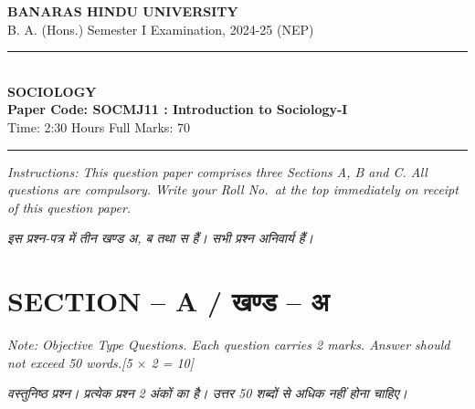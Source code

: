 \documentclass[11pt,a4paper]{article}
\newcommand{\pts}[1]{\hfill \textit{[#1]}}
\begin{document}
\begin{center}
  {\large\bfseries BANARAS HINDU UNIVERSITY}\\[2pt]
  {\normalsize B. A. (Hons.) Semester I Examination, 2024-25 (NEP)}\\[6pt]
  \rule{0.8\linewidth}{0.5pt}\\[6pt]
  {\large\bfseries SOCIOLOGY}\\[4pt]
  {\large\bfseries Paper Code: SOCMJ11 : Introduction to Sociology-I}\\[4pt]
  {\normalsize Time: 2:30 Hours \hfill Full Marks: 70}
\end{center}
\rule{\linewidth}{0.4pt}
\smallskip

\noindent \textit{Instructions: This question paper comprises three Sections A, B and C. All questions are compulsory. Write your Roll No.\ at the top immediately on receipt of this question paper.}

\smallskip
\noindent \textit{इस प्रश्न-पत्र में तीन खण्ड अ, ब तथा स हैं। सभी प्रश्न अनिवार्य हैं।}

\bigskip

\section*{SECTION -- A / खण्ड -- अ}
\noindent \textit{Note: Objective Type Questions. Each question carries 2 marks. Answer should not exceed 50 words.}\pts{5 $\times$ 2 = 10}

\noindent \textit{वस्तुनिष्ठ प्रश्न। प्रत्येक प्रश्न 2 अंकों का है। उत्तर 50 शब्दों से अधिक नहीं होना चाहिए।}
\end{document}
